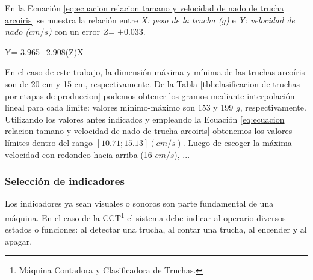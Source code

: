 En la Ecuación \ref{eq:ecuacion relacion tamano y velocidad de nado de trucha arcoiris} se muestra la relación entre \textit{X: peso de la trucha ($g$)} e \textit{Y: velocidad de nado ($cm/s$)} con un error \textit{Z= $\pm 0.033$}. 

\begin{myequation} \label{eq:ecuacion relacion tamano y velocidad de nado de trucha arcoiris}
	Y=-3.965+2.908(Z)X
\end{myequation}

En el caso de este trabajo, la dimensión máxima y mínima de las truchas arcoíris son de 20 cm y 15 cm, respectivamente. De la Tabla \ref{tbl:clasificacion de truchas por etapas de produccion} podemos obtener los gramos mediante interpolación lineal para cada límite: valores mínimo-máximo son 153 y 199 \textit{$g$}, respectivamente. Utilizando los valores antes indicados y empleando la Ecuación \ref{eq:ecuacion relacion tamano y velocidad de nado de trucha arcoiris} obtenemos los valores límites dentro del rango $[10.71; 15.13] (cm/s)$. Luego de escoger la máxima velocidad con redondeo hacia arriba (16 $cm/s$), ...


\subsubsection{Selección de indicadores}

Los indicadores ya sean visuales o sonoros son parte fundamental de una máquina. En el caso de la CCT\footnote{Máquina Contadora y Clasificadora de Truchas.} el sistema debe indicar al operario diversos estados o funciones: al detectar una trucha, al contar una trucha, al encender y al apagar.

